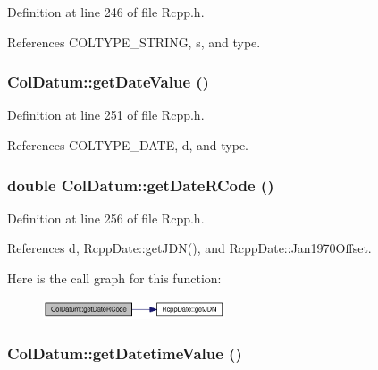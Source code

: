 Definition at line 246 of file Rcpp.h.

References COLTYPE\_\-STRING, s, and type.\hypertarget{classColDatum_70480f53f9cee46bcdaed7331e38c943}{
\subsubsection[getDateValue]{ ColDatum::getDateValue ()}}
\label{classColDatum_70480f53f9cee46bcdaed7331e38c943}




Definition at line 251 of file Rcpp.h.

References COLTYPE\_\-DATE, d, and type.\hypertarget{classColDatum_87c424137afc43068bf1aba75035851d}{
\subsubsection[getDateRCode]{\setlength{\rightskip}{0pt plus 5cm}double ColDatum::getDateRCode ()}}
\label{classColDatum_87c424137afc43068bf1aba75035851d}




Definition at line 256 of file Rcpp.h.

References d, RcppDate::getJDN(), and RcppDate::Jan1970Offset.

Here is the call graph for this function:\nopagebreak
\begin{figure}[H]
\begin{center}
\leavevmode
\includegraphics[width=153pt]{classColDatum_87c424137afc43068bf1aba75035851d_cgraph}
\end{center}
\end{figure}
\hypertarget{classColDatum_408e78096b13b5047ae25e99e945ebf6}{
\subsubsection[getDatetimeValue]{ ColDatum::getDatetimeValue ()}}
\label{classColDatum_408e78096b13b5047ae25e99e945ebf6}




